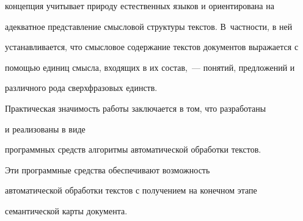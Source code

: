 концепция учитывает природу естественных языков и ориентирована на 

адекватное представление смыс\-ло\-вой структуры текстов. В~частности, в ней 

устанавливается, что смысловое содержание текстов документов выражается с 

помощью единиц смысла, входящих в их состав,~--- понятий, предложений и 

различного рода сверхфразовых единств.

     

     Практическая значимость работы заключается в том, что разработаны 

и реализованы в виде 

программных средств алгоритмы автоматической обработки текстов. 

Эти программные средства обеспечивают возможность 

автоматической обработки текстов с получением на конечном этапе 

семантической карты документа.



